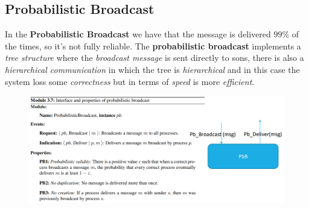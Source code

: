 \documentclass{article}
\begin{document}
\subsection{Probabilistic Broadcast}
In the \textbf{Probabilistic Broadcast} we have that the message is delivered $99\%$ of the times, so it's not fully reliable. The \textbf{probabilistic broadcast} implements a \emph{tree structure} where the \emph{broadcast message} is sent directly to sons, there is also a \emph{hierarchical communication} in which the tree is \emph{hierarchical} and in this case the system loss some \emph{correctness} but in terms of \emph{speed} is more \emph{efficient}. 
\begin{figure}[H]
  \centering
  \includegraphics[scale=0.7,left]{cattura40.png}
\end{figure}
\end{document}
